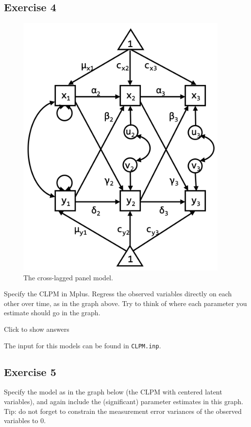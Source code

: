 \documentclass[
]{book}
\begin{document}
\hypertarget{exercise-4}{%
\subsection{Exercise 4}\label{exercise-4}}

\begin{figure}
\centering
\includegraphics[width=4.16667in,height=\textheight]{CLPM2.png}
\caption{The cross-lagged panel model.}
\end{figure}

Specify the CLPM in Mplus. Regress the observed variables directly on each other over time, as in the graph above. Try to think of where each parameter you estimate should go in the graph.

Click to show answers

The input for this models can be found in \texttt{CLPM.inp}.

\hypertarget{exercise-5}{%
\subsection{Exercise 5}\label{exercise-5}}

Specify the model as in the graph below (the CLPM with centered latent variables), and again include the (significant) parameter estimates in this graph. Tip: do not forget to constrain the measurement error variances of the observed variables to 0.
\end{document}
